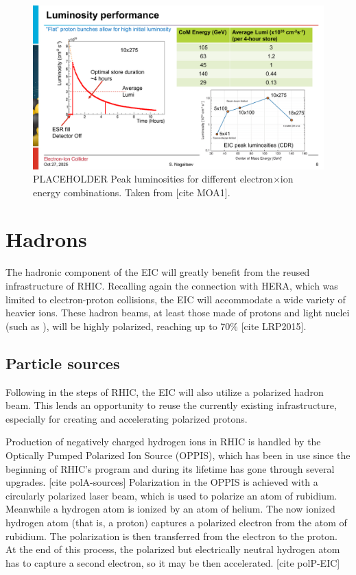 \begin{figure}[ht]
    \centering
    \includegraphics[width=.85\linewidth]{img/luminosity2_placeholder.pdf}
    \caption{PLACEHOLDER Peak luminosities for different electron$\times$ion energy combinations. Taken from [cite MOA1].} %
    \label{fig:eic:lumi}
\end{figure}

\section{Hadrons}
The hadronic component of the EIC will greatly benefit from the reused infrastructure of RHIC. Recalling again the connection with HERA, which was limited to electron-proton collisions, the EIC will accommodate a wide variety of heavier ions. These hadron beams, at least those made of protons and light nuclei (such as ), will be highly polarized, reaching up to 70\% [cite LRP2015].

\subsection{Particle sources}
Following in the steps of RHIC, the EIC will also utilize a polarized hadron beam. This lends an opportunity to reuse the currently existing infrastructure, especially for creating and accelerating polarized protons. 

Production of negatively charged hydrogen ions in RHIC is handled by the Optically Pumped Polarized Ion Source (OPPIS), which has been in use since the beginning of RHIC's program and during its lifetime has gone through several upgrades. [cite polA-sources] Polarization in the OPPIS is achieved with a circularly polarized laser beam, which is used to polarize an atom of rubidium. Meanwhile a hydrogen atom is ionized by an atom of helium. The now ionized hydrogen atom (that is, a proton) captures a polarized electron from the atom of rubidium. The polarization is then transferred from the electron to the proton. At the end of this process, the polarized but electrically neutral hydrogen atom has to capture a second electron, so it may be then accelerated. [cite polP-EIC]

